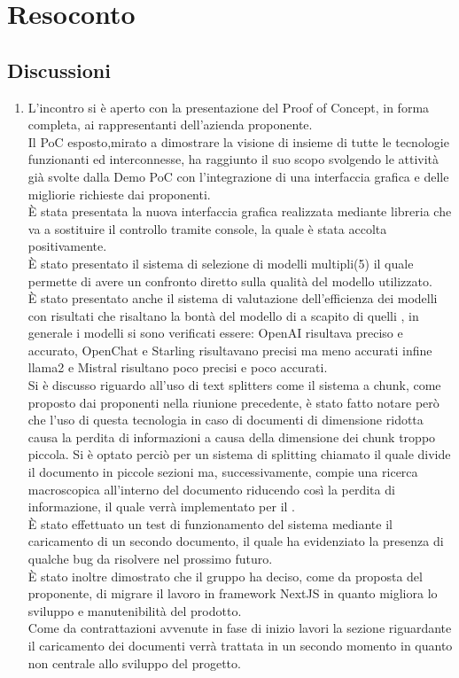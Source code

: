 \section{Resoconto} \label{sec:resoconto}
\subsection{Discussioni} \label{subsec:resdiscussione}
\begin{enumerate}
    \item L'incontro si è aperto con la presentazione del Proof of Concept, in forma completa, ai rappresentanti dell'azienda proponente.\\Il PoC esposto,mirato a dimostrare la visione di insieme di tutte le tecnologie funzionanti ed interconnesse, ha raggiunto il suo scopo svolgendo le attività già svolte dalla Demo PoC con l'integrazione di una interfaccia grafica e delle migliorie richieste dai proponenti.\\È stata presentata la nuova interfaccia grafica realizzata mediante libreria  che va a sostituire il controllo tramite console, la quale è stata accolta positivamente.\\È stato presentato il sistema di selezione di modelli multipli(5) il quale permette di avere un confronto diretto sulla qualità del modello utilizzato.\\È stato presentato anche il sistema di valutazione dell'efficienza dei modelli con risultati che risaltano la bontà del modello di  a scapito di quelli , in generale i modelli si sono verificati essere: OpenAI risultava preciso e accurato, OpenChat e Starling risultavano precisi ma meno accurati infine llama2 e Mistral risultano poco precisi e poco accurati.\\Si è discusso riguardo all'uso di text splitters come il sistema a chunk, come proposto dai proponenti nella riunione precedente, è stato fatto notare però che l'uso di questa tecnologia in caso di documenti di dimensione ridotta causa la perdita di informazioni a causa della dimensione dei chunk troppo piccola. Si è optato perciò per un sistema di splitting chiamato  il quale divide il documento in piccole sezioni ma, successivamente, compie una ricerca macroscopica all'interno del documento riducendo così la perdita di informazione, il quale verrà implementato per il .\\È stato effettuato un test di funzionamento del sistema mediante il caricamento di un secondo documento, il quale ha evidenziato la presenza di qualche bug da risolvere nel prossimo futuro.\\È stato inoltre dimostrato che il gruppo ha deciso, come da proposta del proponente, di migrare il lavoro in framework NextJS in quanto migliora lo sviluppo e manutenibilità del prodotto.\\Come da contrattazioni avvenute in fase di inizio lavori la sezione riguardante il caricamento dei documenti verrà trattata in un secondo momento in quanto non centrale allo sviluppo del progetto.

\end{enumerate}
